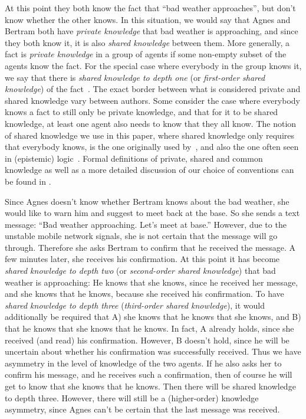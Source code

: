 At this point they both know the fact that ``bad weather approaches'', but don't know whether the other knows. In this situation, we would say that Agnes and Bertram both have \emph{private knowledge} that bad weather is approaching, and since they both know it, it is also \emph{shared knowledge} between them. More generally, a fact is \emph{private knowledge} in a group of agents if some non-empty subset of the agents know the fact. For the special case where everybody in the group knows it, we say that there is \emph{shared knowledge to depth one} (or \emph{first-order shared knowledge}) of the fact~\cite{clark1981definite}. The exact border between what is considered private and shared knowledge vary between authors. Some consider the case where everybody knows a fact to still only be private knowledge, and that for it to be shared knowledge, at least one agent also needs to know that they all know. The notion of shared knowledge we use in this paper, where shared knowledge only requires that everybody knows, is the one originally used by~\cite{clark1981definite}, and also the one often seen in (epistemic) logic~\cite{herzig2015share}. Formal definitions of private, shared and common knowledge as well as a more detailed discussion of our choice of conventions can be found in .

Since Agnes doesn't know whether Bertram knows about the bad weather, she would like to warn him and suggest to meet back at the base. So she sends a text message: ``Bad weather approaching. Let's meet at base.'' However, due to the unstable mobile network signals, she is not certain that the message will go through. Therefore she asks Bertram to confirm that he received the  message. A few minutes later, she receives his confirmation. At this point it has become \emph{shared knowledge to depth two} (or \emph{second-order shared knowledge}) that bad weather is approaching: He knows that she knows, since he received her message, and she knows that he knows, because she received his confirmation. To have \emph{shared knowledge to depth three} (\emph{third-order shared knowledge}), it would additionally be required that A) she knows that he knows that she knows, and B) that he knows that she knows that he knows. In fact, A already holds, since she received (and read) his confirmation. However, B doesn't hold, since he will be uncertain about whether his confirmation was successfully received. Thus we have asymmetry in the level of knowledge of the two agents. If he also asks her to confirm his message, and he receives such a confirmation, then of course he will get to know that she knows that he knows. Then there will be shared knowledge to depth three. However, there will still be a (higher-order) knowledge asymmetry, since Agnes can't be certain that the last message was received.

